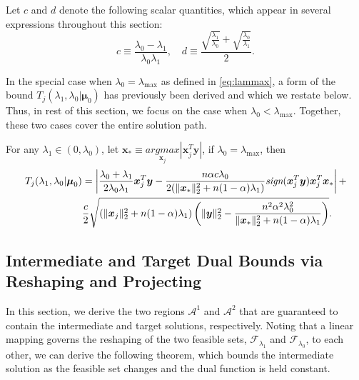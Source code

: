 Let $c$ and $d$ denote the following scalar quantities, which appear in several expressions throughout this section:
\begin{equation}
    c\equiv\frac{\lambda_0-\lambda_1}{\lambda_0\lambda_1},\quad d\equiv \frac{\sqrt{\frac{\lambda_1}{\lambda_0}}+\sqrt{\frac{\lambda_0}{\lambda_1}}}{2}.
\end{equation}

In the special case when $\lambda_0=\lambda_{\max}$ as defined in \eqref{eq:lammax}, a form of the bound $T_j(\lambda_{1},\lambda_{0}|\boldsymbol\mu_0)$ has previously been derived \citep{Zeng2021} and which we restate below. Thus, in rest of this section, we focus on the case when $\lambda_0<\lambda_{\max}$. Together, these two cases cover the entire solution path.

\begin{theorem}
    \label{thm:0.1}
    For any $\lambda_1\in(0,\lambda_{0})$, let $\boldsymbol x_*\equiv\underset{\boldsymbol x_j}{argmax}|\boldsymbol x_j^T\boldsymbol y|$, if $\lambda_0=\lambda_{\max}$, then
    \begin{gather}
        \begin{aligned}
            T_j(\lambda_{1},\lambda_{0}|\boldsymbol\mu_0)&=\left|\frac{\lambda_{0}+\lambda_1}{2\lambda_{0}\lambda_1}\boldsymbol x_j^T\boldsymbol y-\frac{n\alpha c\lambda_{0}}{2(\lVert\boldsymbol x_*\rVert_2^2+n(1-\alpha)\lambda_1)}\textit{sign}(\boldsymbol x_j^T\boldsymbol y) \boldsymbol x_j^T\boldsymbol x_*\right|+\\
            &\frac{c}{2}\sqrt{\left(\lVert\boldsymbol x_j\rVert_2^2+n(1-\alpha)\lambda_1\right)\left(\lVert\boldsymbol y\rVert_2^2-\frac{n^2\alpha^2\lambda_{0}^2}{\lVert\boldsymbol x_*\rVert_2^2+n(1-\alpha)\lambda_1}\right)}.
        \end{aligned}
    \end{gather}
\end{theorem}

\subsection{Intermediate and Target Dual Bounds via Reshaping and Projecting}
\label{sec:bounds}

In this section, we derive the two regions $\mathcal{A}^1$ and $\mathcal{A}^2$ that are guaranteed to contain the intermediate and target solutions, respectively. Noting that a linear mapping governs the reshaping of the two feasible sets, $\mathcal{F}_{\lambda_1}$ and $\mathcal{F}_{\lambda_0}$, to each other, we can derive the following theorem, which bounds the intermediate solution as the feasible set changes and the dual function is held constant.

